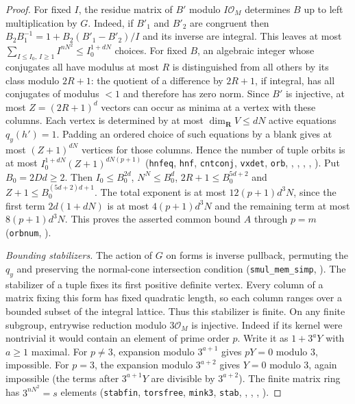 \begin{proof}
For fixed $I$, the residue matrix of $B'$ modulo $I\mathcal O_M$
determines $B$ up to left multiplication by $G$. Indeed, if $B'_1$
and $B'_2$ are congruent then $B_2 B_1^{-1}=1+B_2(B'_1-B'_2)/I$
and its inverse are integral. This leaves at most
$\sum_{I\le I_0,\, I\ge1} I^{nN^2}\le I_0^{1+dN}$ choices.
For fixed $B$, an algebraic integer whose conjugates all have modulus
at most $R$ is distinguished from all others by its class modulo
$2R+1$: the quotient of a difference by $2R+1$, if integral, has all
conjugates of modulus $<1$ and therefore has zero norm. Since $B'$ is
injective, at most $Z=(2R+1)^d$ vectors can occur as minima at a
vertex with these columns. Each vertex is determined by at most
$\dim_{\mathbf R} V\le dN$ active equations $q_y(h')=1$.
Padding an ordered choice of such equations by a blank gives at most
$(Z+1)^{dN}$ vertices for those columns. Hence the number of tuple
orbits is at most $I_0^{1+dN}(Z+1)^{dN(p+1)}$
(\nolinkurl{hnfeq}, \nolinkurl{hnf}, \nolinkurl{cntconj}, \nolinkurl{vxdet},
\nolinkurl{orb}, ,
, ,
,
).
Put $B_0=2Dd\ge2$. Then $I_0\le B_0^{2d}$, $N^N\le B_0^d$,
$2R+1\le B_0^{5d+2}$ and $Z+1\le B_0^{(5d+2)d+1}$.
The total exponent is at most $12(p+1)d^3N$, since the first
term $2d(1+dN)$ is at most $4(p+1)d^3N$ and the remaining term
at most $8(p+1)d^3N$. This proves the asserted common bound $A$
through $p=m$ (\nolinkurl{orbnum}, ).

\emph{Bounding stabilizers.}
The action of $G$ on forms is inverse pullback, permuting the $q_y$
and preserving the normal-cone intersection condition
(\nolinkurl{smul_mem_simp}, ).
The stabilizer of a tuple fixes its first positive definite vertex.
Every column of a matrix fixing this form has fixed quadratic length,
so each column ranges over a bounded subset of the integral lattice.
Thus this stabilizer is finite. On any finite subgroup, entrywise
reduction modulo $3\mathcal O_M$ is injective. Indeed if its kernel
were nontrivial it would contain an element of prime order $p$.
Write it as $1+3^aY$ with $a\ge1$ maximal. For $p\ne3$, expansion
modulo $3^{a+1}$ gives $pY=0$ modulo $3$, impossible. For $p=3$,
the expansion modulo $3^{a+2}$ gives $Y=0$ modulo $3$, again
impossible (the terms after $3^{a+1}Y$ are divisible by $3^{a+2}$).
The finite matrix ring has $3^{nN^2}=s$ elements
(\nolinkurl{stabfin}, \nolinkurl{torsfree}, \nolinkurl{mink3},
\nolinkurl{stab}, ,
,
, ).


\end{proof}

